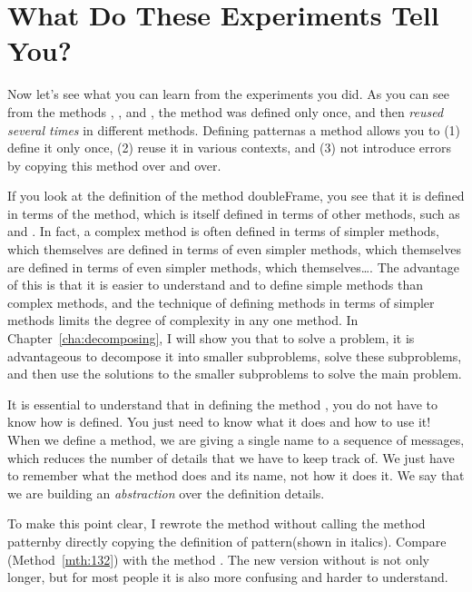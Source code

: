 \documentclass[a4paper,10pt,twoside]{book}
\begin{document}
\section{What Do These Experiments Tell You?} 

Now let’s see what you can learn from the experiments you did. As you can see from the methods , , and , the method  was defined only once, 
and then \emph{reused several times} in different methods. Defining patternas a method allows you 
to (1) define it only once, (2) reuse it in various contexts, and (3) not introduce errors by copying this method over and over. 

If you look at the definition of the method doubleFrame, you see that it is defined in terms 
of the  method, which is itself defined in terms of other methods, such as  and 
. In fact, a complex method is often defined in terms of simpler methods, which 
themselves are defined in terms of even simpler methods, which themselves are defined in 
terms of even simpler methods, which themselves\ldots. The advantage of this is that it is easier 
to understand and to define simple methods than complex methods, and the technique of 
defining methods in terms of simpler methods limits the degree of complexity in any one 
method. In Chapter~\ref{cha:decomposing}, I will show you that to solve a problem, it is advantageous to decompose it into smaller subproblems, solve these subproblems, and then use the solutions to the smaller subproblems to solve the main problem. 


It is essential to understand that in defining the method , you do not have to 
know how  is defined. You just need to know what it does and how to use it! When we 
define a method, we are giving a single name to a sequence of messages, which reduces the 
number of details that we have to keep track of. We just have to remember what the method 
does and its name, not how it does it. We say that we are building an \emph{abstraction} over the definition details. 

To make this point clear, I rewrote the method  without calling the method 
patternby directly copying the definition of pattern(shown in italics). Compare  
 (Method~\ref{mth:132}) with the method . The new version without 
 is not only longer, but for most people it is also more confusing and harder to understand. 
\end{document}
